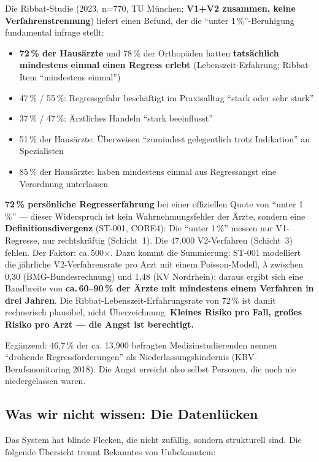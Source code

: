 \documentclass{umbruch-position}
\begin{document}
Die Ribbat-Studie (2023, n=770, TU München; \textbf{V1+V2 zusammen, keine Verfahrenstrennung}) liefert einen Befund, der die ``unter 1\,\%''-Beruhigung fundamental infrage stellt:

\begin{itemize}[nosep]
  \item \textbf{72\,\% der Hausärzte} und 78\,\% der Orthopäden hatten \textbf{tatsächlich mindestens einmal einen Regress erlebt} (Lebenszeit-Erfahrung; Ribbat-Item ``mindestens einmal'')
  \item 47\,\% / 55\,\%: Regressgefahr beschäftigt im Praxisalltag ``stark oder sehr stark''
  \item 37\,\% / 47\,\%: Ärztliches Handeln ``stark beeinflusst''
  \item 51\,\% der Hausärzte: Überweisen ``zumindest gelegentlich trotz Indikation'' an Spezialisten
  \item 85\,\% der Hausärzte: haben mindestens einmal aus Regressangst eine Verordnung unterlassen
\end{itemize}

\textbf{72\,\% persönliche Regresserfahrung} bei einer offiziellen Quote von ``unter 1\,\%'' --- dieser Widerspruch ist kein Wahrnehmungsfehler der Ärzte, sondern eine \textbf{Definitionsdivergenz} (ST-001, CORE4): Die ``unter 1\,\%'' messen nur V1-Regresse, nur rechtskräftig (Schicht~1). Die 47.000 V2-Verfahren (Schicht~3) fehlen. Der Faktor: ca.\,500$\times$. Dazu kommt die Summierung: ST-001 modelliert die jährliche V2-Verfahrensrate pro Arzt mit einem Poisson-Modell, $\lambda$ zwischen 0{,}30 (BMG-Bundesrechnung) und 1{,}48 (KV Nordrhein); daraus ergibt sich eine Bandbreite von \textbf{ca.\,60--90\,\% der Ärzte mit mindestens einem Verfahren in drei Jahren}. Die Ribbat-Lebenszeit-Erfahrungsrate von 72\,\% ist damit rechnerisch plausibel, nicht Überzeichnung. \textbf{Kleines Risiko pro Fall, großes Risiko pro Arzt --- die Angst ist berechtigt.}

Ergänzend: 46,7\,\% der ca. 13.900 befragten Medizinstudierenden nennen ``drohende Regressforderungen'' als Niederlassungshindernis (KBV-Berufsmonitoring 2018). Die Angst erreicht also selbst Personen, die noch nie niedergelassen waren.

\subsection{Was wir nicht wissen: Die Datenlücken}

Das System hat blinde Flecken, die nicht zufällig, sondern strukturell sind. Die folgende Übersicht trennt Bekanntes von Unbekanntem:
\end{document}
